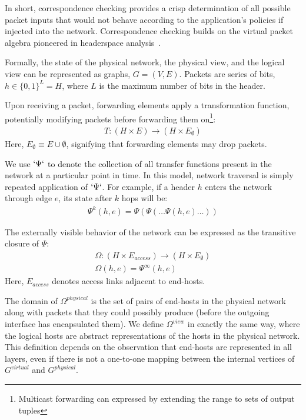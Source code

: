 In short, correspondence checking provides a crisp determination of all possible packet inputs that
would not behave according to the application's policies if injected into the
network. Correspondence checking builds on the virtual packet algebra pioneered in headerspace
analysis~\cite{hsa}.


Formally, the state of the physical network, the physical view, and the
logical view can be represented as graphs,
$G = (V, E)$. Packets are series of bits, $h \in \{0,1\}^L = H$,
where $L$ is the maximum number of bits in the header.

Upon receiving a packet,
forwarding elements apply a transformation function, potentially modifying
packets before forwarding them on\footnote{Multicast forwarding can expressed
by extending the range to sets of output tuples}:
\begin{align*}
T: (H \times E) \rightarrow (H \times E_{\emptyset})
\end{align*}
Here, $E_{\emptyset} \equiv E \cup \emptyset$, signifying that forwarding elements
may drop packets.

We use $`\Psi`$ to denote the collection of all transfer functions present in
the network at a particular point in time. In this model, network traversal is
simply repeated application of $`\Psi`$.
For example, if a header $h$ enters the network through edge
$e$, its state after $k$ hops will be:
\begin{align*}
\Psi^k(h,e) = \Psi(\Psi(\dots \Psi(h,e)\dots))
\end{align*}

The externally visible behavior of the network can be expressed as the
transitive closure of $\Psi$:
\begin{align*}
\Omega: (H \times E_{access}) \rightarrow (H \times E_{\emptyset}) \\
\Omega(h,e) = \Psi^{\infty}(h,e)
\end{align*}
Here, $E_{access}$ denotes access links adjacent to end-hosts.

The domain of $\Omega^{physical}$ is the set of pairs of end-hosts in the
physical network along with packets that they could possibly produce (before
the outgoing interface has encapsulated them). We define $\Omega^{view}$ in exactly the same way, where
the logical hosts are abstract representations of the hosts in the physical
network. This definition depends on the observation that end-hosts are represented
in all layers, even if there is not a one-to-one mapping between the
internal vertices of $G^{virtual}$ and $G^{physical}$.

